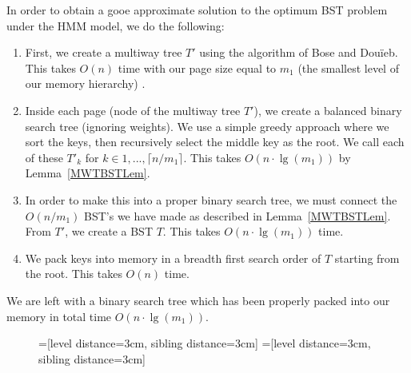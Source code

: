 \documentclass[]{beamer}
\theoremstyle{plain}
\begin{document}
\begin{frame}[fragile]
In order to obtain a gooe approximate solution to the optimum BST problem under the HMM model, we do the following:

\begin{enumerate}
\item First, we create a multiway tree $T'$ using the algorithm of Bose and Dou\"{i}eb. This takes $O(n)$ time with our page size equal to $m_1$ (the smallest level of our memory hierarchy) \cite{bose2009efficient}.

\item Inside each page (node of the multiway tree $T'$), we create a balanced binary search tree (ignoring weights). We use a simple greedy approach where we sort the keys, then recursively select the middle key as the root.  We call each of these $T'_k$ for $k \in {1,...,\lceil n/m_1 \rceil}$. This takes $O(n\cdot\lg(m_1))$ by Lemma~\ref{MWTBSTLem}.

\item In order to make this into a proper binary search tree, we must connect the $O(n/m_1)$ BST's we have made as described in Lemma~\ref{MWTBSTLem}. From $T'$, we create a BST $T$. This takes $O(n\cdot\lg(m_1))$ time.

\item We pack keys into memory in a breadth first search order of $T$ starting from the root. This takes $O(n)$ time.

\end{enumerate}

\noindent We are left with a binary search tree which has been properly packed into our memory in total time $O(n\cdot\lg(m_1))$.

\pagebreak
\begin{figure}[H]

=[level distance=3cm, sibling distance=3cm]
=[level distance=3cm, sibling distance=3cm]

\begin{center}
\begin{subfigure}[b]{0.36\textwidth}

\scriptsize


\end{subfigure}
\end{center}
\end{figure}
\end{frame}
\end{document}
